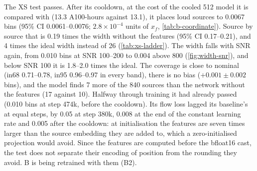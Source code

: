 The XS test passes. After its cooldown, at the cost of the cooled 512 model it is compared
with (13.3 A100-hours against 13.1), it places loud sources to 0.0067 bins (95\% CI
0.0061--0.0076; $2.8\times10^{-4}$ units of $x_f$, \cref{tab:b-coordinate}). Source by source
that is 0.19 times the width without the features (95\% CI 0.17--0.21), and 4 times the ideal
width instead of 26 (\cref{tab:xs-ladder}). The width falls with SNR again, from 0.010 bins at SNR
100--200 to 0.004 above 800 (\cref{fig:width-snr}), and below SNR 100 it is 1.8--2.0 times the
ideal. The coverage is close to nominal (in68 0.71--0.78, in95 0.96--0.97 in every band), there
is no bias ($+0.001\pm0.002$ bins), and the model finds 7 more of the 840 sources than the
network without the features (17 against 10). Halfway through training it had already passed
(0.010 bins at step 474k, before the cooldown). Its flow loss lagged its baseline's at equal
steps, by 0.05 at step 380k, 0.008 at the end of the constant learning rate and 0.005 after the
cooldown: at initialisation the features are seven times larger than the source embedding they
are added to, which a zero-initialised projection would avoid. Since the features are computed
before the bfloat16 cast, the test does not separate their encoding of position from the
rounding they avoid. B is being retrained with them (B2). \tbd[ B2]

